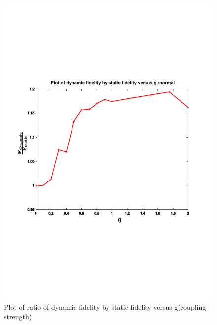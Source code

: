 \begin{center}
\begin{figure}%
\includegraphics[width=1.1\textwidth]{E_dynamic_static_versus_g__normal}
\caption{Plot of ratio of dynamic fidelity by static fidelity versus g(coupling strength)}
\label{E_dynamic_static_versus_g__normal}
\end{figure}
\end{center}










